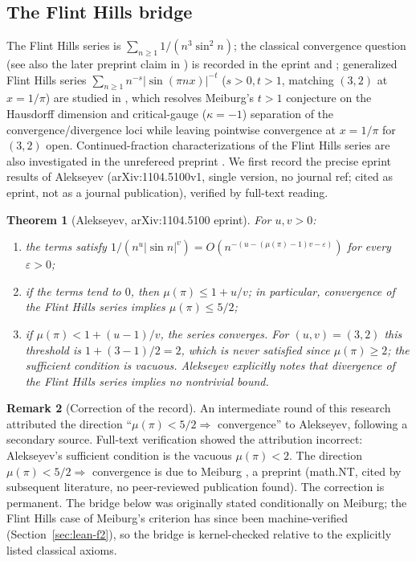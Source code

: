 \documentclass[11pt]{amsart}
\newtheorem{theorem}{Theorem}[section]
\theoremstyle{definition}
\newtheorem{remark}[theorem]{Remark}
\theoremstyle{remark}
\numberwithin{equation}{section}
\newcommand{\irr}{\mu}
\begin{document}
\subsection{The Flint Hills bridge}\label{sec:flint-bridge}

The Flint Hills series is $\sum_{n\ge1}1/(n^3\sin^2n)$; the classical convergence question (see also the later preprint claim in \cite{OpenAI2026}) is recorded in the eprint \cite{Alekseyev2011} and \cite{FormalConjectures}; generalized Flint Hills series $\sum_{n\ge1}n^{-s}|\sin(\pi n x)|^{-t}$ ($s>0, t>1$, matching $(3,2)$ at $x=1/\pi$) are studied in \cite{Dan2026}, which resolves Meiburg's $t>1$ conjecture on the Hausdorff dimension and critical-gauge ($\kappa=-1$) separation of the convergence/divergence loci while leaving pointwise convergence at $x=1/\pi$ for $(3,2)$ open. Continued-fraction characterizations of the Flint Hills series are also investigated in the unrefereed preprint \cite{Zapata2026}. We first record the precise eprint results of Alekseyev \cite{Alekseyev2011} (arXiv:1104.5100v1, single version, no journal ref; cited as eprint, not as a journal publication), verified by full-text reading.

\begin{theorem}[Alekseyev, arXiv:1104.5100 eprint]\label{thm:alekseyev}
For $u,v>0$:
\begin{enumerate}
\item the terms satisfy $1/(n^u|\sin n|^v)=O(n^{-(u-(\irr(\pi)-1)v-\varepsilon)})$ for every $\varepsilon>0$;
\item if the terms tend to $0$, then $\irr(\pi)\le1+u/v$; in particular, convergence of the Flint Hills series implies $\irr(\pi)\le5/2$;
\item if $\irr(\pi)<1+(u-1)/v$, the series converges. For $(u,v)=(3,2)$ this threshold is $1+(3-1)/2=2$, which is never satisfied since $\irr(\pi)\ge2$; the sufficient condition is vacuous. Alekseyev explicitly notes that divergence of the Flint Hills series implies no nontrivial bound.
\end{enumerate}
\end{theorem}

\begin{remark}[Correction of the record]
An intermediate round of this research attributed the direction ``$\irr(\pi)<5/2\Rightarrow$ convergence'' to Alekseyev, following a secondary source. Full-text verification showed the attribution incorrect: Alekseyev's sufficient condition is the vacuous $\irr(\pi)<2$. The direction $\irr(\pi)<5/2\Rightarrow$ convergence is due to Meiburg \cite{Meiburg2022}, a preprint (math.NT, cited by subsequent literature, no peer-reviewed publication found). The correction is permanent. The bridge below was originally stated conditionally on Meiburg; the Flint Hills case of Meiburg's criterion has since been machine-verified (Section~\ref{sec:lean-f2}), so the bridge is kernel-checked relative to the explicitly listed classical axioms.
\end{remark}
\end{document}
